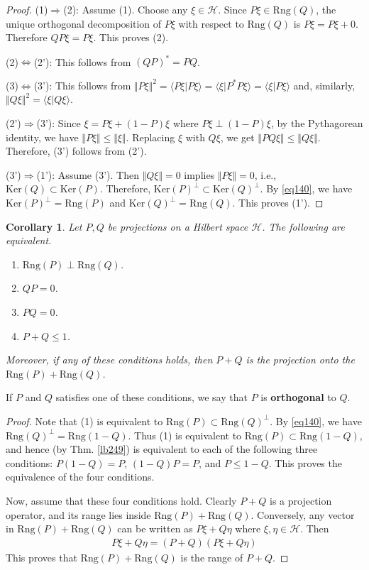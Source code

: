 \documentclass[12pt,b5paper,notitlepage]{article}
\theoremstyle{definition}
\theoremstyle{plain}
\newtheorem{co}[df]{Corollary}
\newcommand{\bk}[1]{\langle {#1}\rangle}
\newcommand{\Ker}{\mathrm{Ker}}
\newcommand{\Rng}{\mathrm{Rng}}
\newcommand{\MH}{\mathcal H}
\numberwithin{equation}{section}
\begin{document}
\begin{proof}
(1)$\Rightarrow$(2): Assume (1). Choose any $\xi\in\MH$. Since $P\xi\in \Rng(Q)$, the unique orthogonal decomposition of $P\xi$ with respect to $\Rng(Q)$ is $P\xi=P\xi+0$. Therefore $QP\xi=P\xi$. This proves (2).

(2)$\Leftrightarrow$(2'): This follows from $(QP)^*=PQ$.

(3)$\Leftrightarrow$(3'): This follows from $\Vert P\xi\Vert^2=\bk{P\xi|P\xi}=\bk{\xi|P^*P\xi}=\bk{\xi|P\xi}$ and, similarly, $\Vert Q\xi\Vert^2=\bk{\xi|Q\xi}$.

(2')$\Rightarrow$(3'): Since $\xi=P\xi+(1-P)\xi$ where $P\xi\perp(1-P)\xi$, by the Pythagorean identity, we have $\Vert P\xi\Vert\leq \Vert\xi\Vert$. Replacing $\xi$ with $Q\xi$, we get $\Vert PQ\xi\Vert\leq\Vert Q\xi\Vert$. Therefore, (3') follows from (2'). 


(3')$\Rightarrow$(1'): Assume (3'). Then $\Vert Q\xi\Vert=0$ implies $\Vert P\xi\Vert=0$, i.e.,  $\Ker(Q)\subset\Ker(P)$. Therefore, $\Ker(P)^\perp\subset\Ker(Q)^\perp$. By \eqref{eq140}, we have $\Ker(P)^\perp=\Rng(P)$ and $\Ker(Q)^\perp=\Rng(Q)$. This proves (1').
\end{proof}

\begin{co}\label{lb322}
Let $P,Q$ be projections on a Hilbert space $\MH$. The following are equivalent.
\begin{enumerate}[label=(\arabic*)]
\item $\Rng(P)\perp\Rng(Q)$.
\item $QP=0$.
\item $PQ=0$. 
\item $P+Q\leq 1$.
\end{enumerate}
Moreover, if any of these conditions holds, then $P+Q$ is the projection onto the $\Rng(P)+\Rng(Q)$.
\end{co}

If $P$ and $Q$ satisfies one of these conditions, we say that $P$ is \textbf{orthogonal} to $Q$. 

\begin{proof}
Note that (1) is equivalent to $\Rng(P)\subset\Rng(Q)^\perp$. By \eqref{eq140}, we have $\Rng(Q)^\perp=\Rng(1-Q)$. Thus (1) is equivalent to $\Rng(P)\subset\Rng(1-Q)$, and hence (by Thm. \ref{lb249}) is equivalent to each of the following three conditions: $P(1-Q)=P$,  $(1-Q)P=P$, and $P\leq 1-Q$. This proves the equivalence of the four conditions.

Now, assume that these four conditions hold. Clearly $P+Q$ is a projection operator, and its range lies inside $\Rng(P)+\Rng(Q)$. Conversely, any vector in $\Rng(P)+\Rng(Q)$ can be written as $P\xi+Q\eta$ where $\xi,\eta\in\MH$. Then
\begin{align*}
P\xi+Q\eta=(P+Q)(P\xi+Q\eta)
\end{align*}
This proves that $\Rng(P)+\Rng(Q)$ is the range of $P+Q$.
\end{proof}
\end{document}
